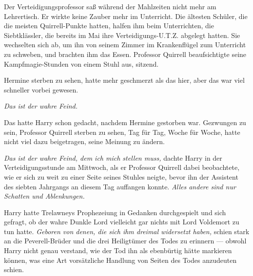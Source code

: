 Der Verteidigungsprofessor saß während der Mahlzeiten nicht mehr am Lehrertisch. Er wirkte keine Zauber mehr im Unterricht. Die ältesten Schüler, die die meisten Quirrell-Punkte hatten, halfen ihm beim Unterrichten, die Siebtklässler, die bereits im Mai ihre Verteidigungs-U.T.Z. abgelegt hatten. Sie wechselten sich ab, um ihn von seinem Zimmer im Krankenflügel zum Unterricht zu schweben, und brachten ihm das Essen. Professor Quirrell beaufsichtigte seine Kampfmagie-Stunden von einem Stuhl aus, sitzend.

Hermine sterben zu sehen, hatte mehr geschmerzt als das hier, aber das war viel schneller vorbei gewesen.

\emph{Das ist der wahre Feind.}

Das hatte Harry schon gedacht, nachdem Hermine gestorben war. Gezwungen zu sein, Professor Quirrell sterben zu sehen, Tag für Tag, Woche für Woche, hatte nicht viel dazu beigetragen, seine Meinung zu ändern.

\emph{Das ist der wahre Feind, dem ich mich stellen muss,} dachte Harry in der Verteidigungsstunde am Mittwoch, als er Professor Quirrell dabei beobachtete, wie er sich zu weit zu einer Seite seines Stuhles neigte, bevor ihn der Assistent des siebten Jahrgangs an diesem Tag auffangen konnte. \emph{Alles andere sind nur Schatten und Ablenkungen.}

Harry hatte Trelawneys Prophezeiung in Gedanken durchgespielt und sich gefragt, ob der wahre Dunkle Lord vielleicht gar nichts mit Lord Voldemort zu tun hatte. \emph{Geboren von denen, die sich ihm dreimal widersetzt haben,} schien stark an die Peverell-Brüder und die drei Heiligtümer des Todes zu erinnern — obwohl Harry nicht genau verstand, wie der Tod ihn als ebenbürtig hätte markieren können, was eine Art vorsätzliche Handlung von Seiten des Todes anzudeuten schien.

